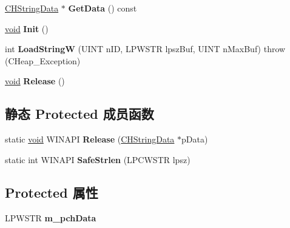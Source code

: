 \begin{DoxyCompactItemize}
\hyperlink{struct_c_h_string_data}{C\+H\+String\+Data} $\ast$ {\bfseries Get\+Data} () const
\item 
\mbox{\label{class_c_h_string_a389905ba59592d05e7511bf6b6c6b3c8}} 
\hyperlink{interfacevoid}{void} {\bfseries Init} ()
\item 
\mbox{\label{class_c_h_string_ad09af1d5dbeb1919e81c33d5ea159249}} 
int {\bfseries Load\+StringW} (U\+I\+NT n\+ID, L\+P\+W\+S\+TR lpsz\+Buf, U\+I\+NT n\+Max\+Buf)  throw (\+C\+Heap\+\_\+\+Exception)
\item 
\mbox{\label{class_c_h_string_aa64e6182c79271507308bdba1d185243}} 
\hyperlink{interfacevoid}{void} {\bfseries Release} ()
\end{DoxyCompactItemize}
\subsection*{静态 Protected 成员函数}
\begin{DoxyCompactItemize}
\item 
\mbox{\label{class_c_h_string_a7347c0bc15de417158440eb3c6c04d1d}} 
static \hyperlink{interfacevoid}{void} W\+I\+N\+A\+PI {\bfseries Release} (\hyperlink{struct_c_h_string_data}{C\+H\+String\+Data} $\ast$p\+Data)
\item 
\mbox{\label{class_c_h_string_a9fe2746e4b4836d398492f04792d2e5b}} 
static int W\+I\+N\+A\+PI {\bfseries Safe\+Strlen} (L\+P\+C\+W\+S\+TR lpsz)
\end{DoxyCompactItemize}
\subsection*{Protected 属性}
\begin{DoxyCompactItemize}
\item 
\mbox{\label{class_c_h_string_a7286fb8a0fde7fb6f0ae8f0841c4cd32}} 
L\+P\+W\+S\+TR {\bfseries m\+\_\+pch\+Data}
\end{DoxyCompactItemize}
